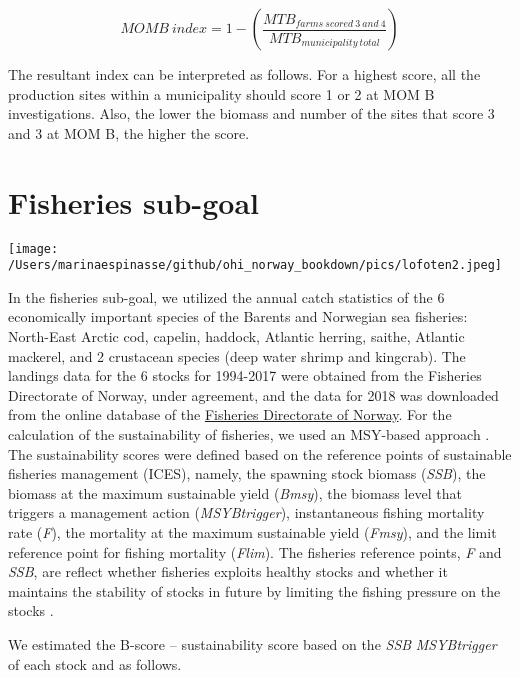 \documentclass[
]{book}
\begin{document}
\begin{equation}
MOMB \ index  = 1 - (\frac{MTB_{farms \ scored \ 3 \ and \ 4}}{MTB_{municipality \ total}})
\label{eq:momb}
\end{equation}

The resultant index can be interpreted as follows. For a highest score, all the production sites within a municipality should score 1 or 2 at MOM B investigations. Also, the lower the biomass and number of the sites that score 3 and 3 at MOM B, the higher the score.

\hypertarget{fisheries-sub-goal}{%
\section{Fisheries sub-goal}\label{fisheries-sub-goal}}

\texttt{[image: /Users/marinaespinasse/github/ohi\_norway\_bookdown/pics/lofoten2.jpeg]}

In the fisheries sub-goal, we utilized the annual catch statistics of the 6 economically important species of the Barents and Norwegian sea fisheries: North-East Arctic cod, capelin, haddock, Atlantic herring, saithe, Atlantic mackerel, and 2 crustacean species (deep water shrimp and kingcrab).
The landings data for the 6 stocks for 1994-2017 were obtained from the Fisheries Directorate of Norway, under agreement, and the data for 2018 was downloaded from the online database of the \href{https://www.fiskeridir.no/Tall-og-analyse/AApne-data/AApne-datasett/Fangstdata-seddel-koblet-med-fartoeydata}{Fisheries Directorate of Norway}.
For the calculation of the sustainability of fisheries, we used an MSY-based approach \citep{gullestad2017towards}. The sustainability scores were defined based on the reference points of sustainable fisheries management (ICES), namely, the spawning stock biomass (\emph{SSB}), the biomass at the maximum sustainable yield (\emph{Bmsy}), the biomass level that triggers a management action (\emph{MSYBtrigger}), instantaneous fishing mortality rate (\emph{F}), the mortality at the maximum sustainable yield (\emph{Fmsy}), and the limit reference point for fishing mortality (\emph{Flim}). The fisheries reference points, \emph{F} and \emph{SSB}, are reflect whether fisheries exploits healthy stocks and whether it maintains the stability of stocks in future by limiting the fishing pressure on the stocks \citep{kleisner2013exploring}.

We estimated the B-score -- sustainability score based on the \emph{SSB} \emph{MSYBtrigger} of each stock and as follows.
\end{document}
